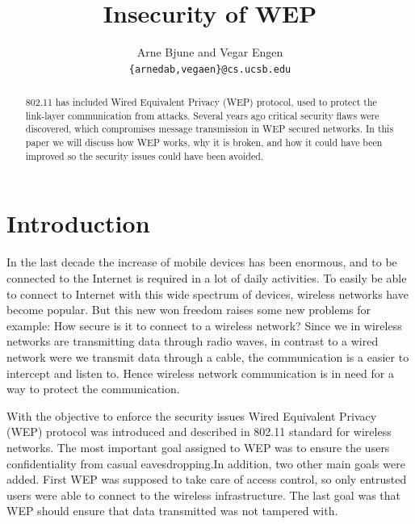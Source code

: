 \documentclass[twocolumn,11pt]{IEEEtran}
\begin{document}
\title{Insecurity of WEP}


\author{Arne Bjune and Vegar Engen \\ \texttt{\{arnedab,vegaen\}@cs.ucsb.edu}}


\maketitle

\begin{abstract}
802.11 has included Wired Equivalent Privacy (WEP) protocol, used to protect the link-layer communication from attacks. Several years ago critical security flaws were discovered, which compromises message transmission in WEP secured networks. In this paper we will discuss how WEP works, why it is broken, and how it could have been improved so the security issues could have been avoided.
\end{abstract}

\section {Introduction}
\label{sec:introduction}

In the last decade the increase of mobile devices has been enormous, and to be connected to the Internet is required in a lot of daily activities. To easily be able to connect to Internet with this wide spectrum of devices, wireless networks have become popular. But this new won freedom raises some new problems for example: How secure is it to connect to a wireless network? Since we in wireless networks are transmitting data through radio waves, in contrast to a wired network were we transmit data through a cable, the communication is a easier to intercept and listen to. Hence wireless network communication is in need for a way to protect the communication. 

With the objective to enforce the security issues Wired Equivalent Privacy (WEP) protocol was introduced and described in 802.11 standard\cite{IEEE:Fast} for wireless networks. The most important goal assigned to WEP was to ensure the users confidentiality from casual eavesdropping.In addition, two other main goals were added. First WEP was supposed to take care of access control, so only entrusted users were able to connect to the wireless infrastructure. The last goal was that WEP should ensure that data transmitted was not tampered with.   
\end{document}
